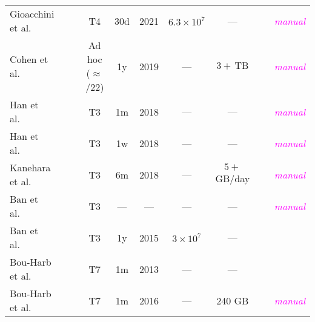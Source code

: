 \documentclass[manuscript,nonacm]{acmart}
\newcommand{\cmark}{\ding{51}}%
\newcommand{\xmark}{\ding{55}}%
\newcommand{\wc}[1]{\textit{\textcolor{magenta}{#1}}} %
\begin{document}
\begin{table*}[h!]
\begin{tabular}{@{}lccccccccc@{}}
		Gioacchini et al.~\cite{2021gioacchini,2023gioacchini} 
		& \cmark & \cmark           
		& T4           
		& 30d   & 2021    
		& $6.3\times10^{7}$ 
		& ---              
		& \cmark~\cite{2020cohen} 
		& \wc{manual}    \\
		
		Cohen et al.~\cite{2020cohen}                          
		& \xmark & \cmark 
		& Ad hoc ($\approx$/22)		              
		& 1y    & 2019    
		& ---                  
		& $3+\,\mathrm{TB}$ 
		& \cmark~\cite{2016ban} 
		& \wc{manual}    \\
		
		Han et al.~\cite{2021han,2022han}                      
		& \cmark & \xmark           
		& T3          
		& 1m    & 2018    
		& ---                  
		& ---              
		& \cmark            
		& \wc{manual}    \\
		
		Han et al.~\cite{2020han,2022han}                      
		& \cmark & \cmark           
		& T3           
		& 1w    & 2018    
		& ---                  
		& ---              
		& \cmark            
		& \wc{manual}    \\
		
		Kanehara et al.~\cite{2019kanehara,2022han}            
		& \xmark & \cmark           
		& T3          
		& 6m    & 2018    
		& ---                  
		& $5+$ GB/day   
		& \cmark            
		& \wc{manual}    \\
		
		Ban et al.~\cite{2017ban}                              
		& \xmark & \xmark           
		& T3          
		& ---     & ---       
		& ---                  
		& ---              
		& \xmark            
		& \wc{manual}    \\
		
		Ban et al.~\cite{2016ban}                              
		& \xmark & \xmark           
		& T3        
		& 1y    & 2015    
		& $3\times10^{7}$  
		& ---              
		& \xmark            
		& \xmark          \\
		
		Bou-Harb et al.~\cite{2014bouharb}                     
		& \xmark & \xmark           
		& T7         
		& 1m    & 2013    
		& ---                  
		& ---              
		& \xmark            
		& \xmark          \\
		
		Bou-Harb et al.~\cite{2019bouharb,2015bouharb}         
		& \xmark & \cmark           
		& T7     
		& 1m    & 2016    
		& ---                  
		& 240 GB        
		& \cmark            
		& \wc{manual}    \\
		

\end{tabular}
\end{table*}
\end{document}
